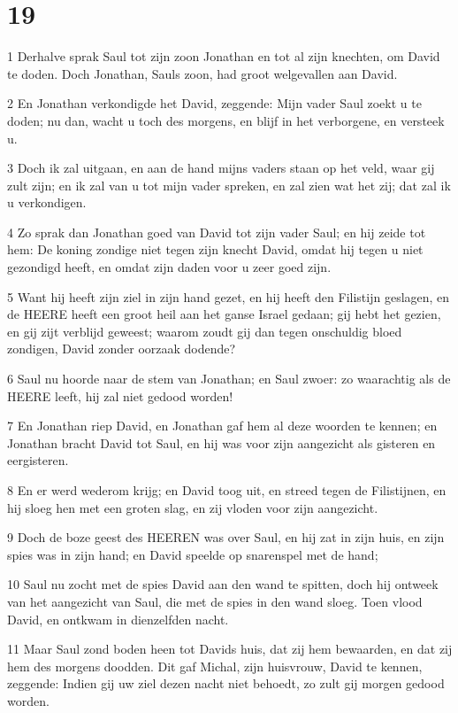 \chapter{19}

\par 1 Derhalve sprak Saul tot zijn zoon Jonathan en tot al zijn knechten, om David te doden. Doch Jonathan, Sauls zoon, had groot welgevallen aan David.
\par 2 En Jonathan verkondigde het David, zeggende: Mijn vader Saul zoekt u te doden; nu dan, wacht u toch des morgens, en blijf in het verborgene, en versteek u.
\par 3 Doch ik zal uitgaan, en aan de hand mijns vaders staan op het veld, waar gij zult zijn; en ik zal van u tot mijn vader spreken, en zal zien wat het zij; dat zal ik u verkondigen.
\par 4 Zo sprak dan Jonathan goed van David tot zijn vader Saul; en hij zeide tot hem: De koning zondige niet tegen zijn knecht David, omdat hij tegen u niet gezondigd heeft, en omdat zijn daden voor u zeer goed zijn.
\par 5 Want hij heeft zijn ziel in zijn hand gezet, en hij heeft den Filistijn geslagen, en de HEERE heeft een groot heil aan het ganse Israel gedaan; gij hebt het gezien, en gij zijt verblijd geweest; waarom zoudt gij dan tegen onschuldig bloed zondigen, David zonder oorzaak dodende?
\par 6 Saul nu hoorde naar de stem van Jonathan; en Saul zwoer: zo waarachtig als de HEERE leeft, hij zal niet gedood worden!
\par 7 En Jonathan riep David, en Jonathan gaf hem al deze woorden te kennen; en Jonathan bracht David tot Saul, en hij was voor zijn aangezicht als gisteren en eergisteren.
\par 8 En er werd wederom krijg; en David toog uit, en streed tegen de Filistijnen, en hij sloeg hen met een groten slag, en zij vloden voor zijn aangezicht.
\par 9 Doch de boze geest des HEEREN was over Saul, en hij zat in zijn huis, en zijn spies was in zijn hand; en David speelde op snarenspel met de hand;
\par 10 Saul nu zocht met de spies David aan den wand te spitten, doch hij ontweek van het aangezicht van Saul, die met de spies in den wand sloeg. Toen vlood David, en ontkwam in dienzelfden nacht.
\par 11 Maar Saul zond boden heen tot Davids huis, dat zij hem bewaarden, en dat zij hem des morgens doodden. Dit gaf Michal, zijn huisvrouw, David te kennen, zeggende: Indien gij uw ziel dezen nacht niet behoedt, zo zult gij morgen gedood worden.
